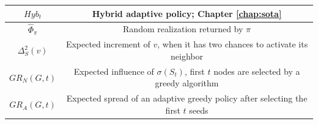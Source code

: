 \begin{table} [ht]
\begin{adjustbox}{width=1\textwidth}
\begin{tabular}{ | c | c | }
    $Hyb_t$& Hybrid adaptive policy; Chapter \ref{chap:sota}\\[1ex] \hline
    $\hat{\Phi}_\pi$& Random realization returned by $\pi$\\[1ex] \hline
    $\Delta^2_S(v)$& Expected increment of $v$, when it has two chances to activate its neighbor\\[1ex] \hline
    $GR_N(G,t)$& Expected influence of $\sigma(S_t)$, first $t$ nodes are selected by a greedy algorithm \\[1ex] \hline
    $GR_A(G,t)$& Expected spread of an adaptive greedy policy after selecting the first $t$ seeds \\[1ex] \hline
    \end{tabular}
    \end{adjustbox}
    \end{table}